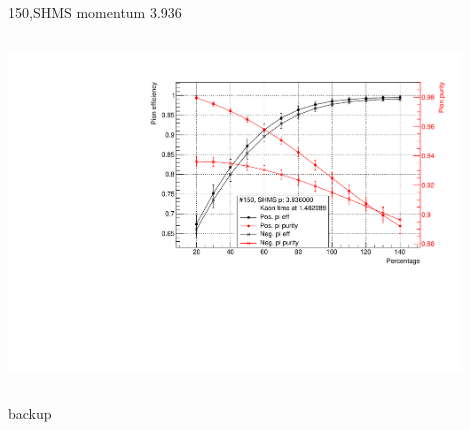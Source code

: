 \documentclass[aspectratio=169,xcolor=dvipsnames]{beamer}
\begin{document}
\begin{frame}{150,SHMS momentum 3.936}
\begin{columns}
\begin{column}[T]{0.3\textwidth}
\includegraphics[width = 0.9\textwidth]{results/pid/SHMS_rf_150_5_pos.pdf}
\end{column}
\end{columns}
\end{frame}

\begin{frame}
  backup
\end{frame}
\end{document}
